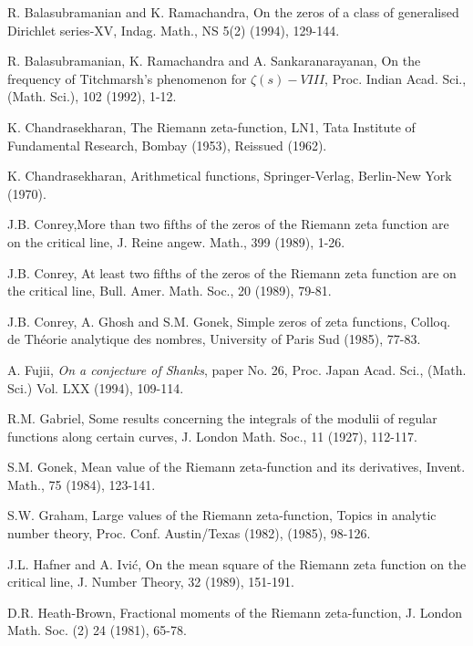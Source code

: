 \begin{thebibliography}{99}
 R. Balasubramanian and K. Ramachandra, On the zeros of a class of generalised Dirichlet series-XV, Indag. Math., NS 5(2) (1994), 129-144.

 R. Balasubramanian, K. Ramachandra and A. Sankaranarayanan, On the frequency of Titchmarsh's phenomenon for $\zeta(s)-VIII$, Proc. Indian Acad. Sci., (Math. Sci.), 102 (1992), 1-12.

 K. Chandrasekharan, The Riemann zeta-function, LN1, Tata Institute of Fundamental Research, Bombay (1953), Reissued (1962). 

 K. Chandrasekharan, Arithmetical functions, Springer-Verlag, Berlin-New York (1970).

 J.B. Conrey,\pageoriginale More than two fifths of the zeros of the Riemann zeta function are on the critical line, J. Reine angew. Math., 399 (1989), 1-26.

 J.B. Conrey, At least two fifths of the zeros of the Riemann zeta function are on the critical line, Bull. Amer. Math. Soc., 20 (1989), 79-81.

 J.B. Conrey, A. Ghosh and S.M. Gonek, Simple zeros of zeta functions, Colloq. de Th\'eorie analytique des nombres, University of Paris Sud (1985), 77-83.

 A. Fujii, \textit{On a conjecture of Shanks}, paper No. 26, Proc. Japan Acad. Sci., (Math. Sci.) Vol. LXX (1994), 109-114.

 R.M. Gabriel, Some results concerning the integrals of the modulii of regular functions along certain curves, J. London Math. Soc., 11 (1927), 112-117.

 S.M. Gonek, Mean value of the Riemann zeta-function and its derivatives, Invent. Math., 75 (1984), 123-141.

 S.W. Graham, Large values of the Riemann zeta-function, Topics in analytic number theory, Proc. Conf. Austin/Texas (1982), (1985), 98-126.

 J.L. Hafner and A. Ivi\'c, On the mean square of the Riemann zeta function on the critical line, J. Number Theory, 32 (1989), 151-191.

 D.R. Heath-Brown, Fractional moments of the Riemann zeta-function, J. London Math. Soc. (2) 24 (1981), 65-78.


\end{thebibliography}
